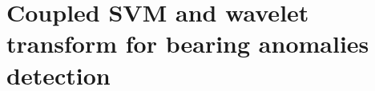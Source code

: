 \documentclass[../Main/thesis.tex]{subfiles}
\begin{document}
\section{Coupled SVM and wavelet transform for bearing anomalies detection}
\label{sec:sectionresult}


















\blankpage
\end{document}
